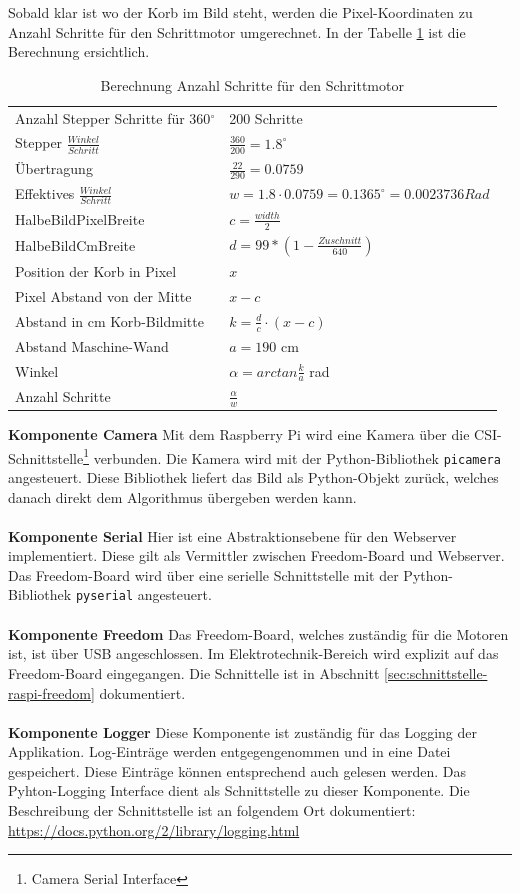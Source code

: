 \newpage
Sobald klar ist wo der Korb im Bild steht, werden die Pixel-Koordinaten zu Anzahl Schritte für den Schrittmotor umgerechnet. In der Tabelle \ref{tab:berechnung-steps} ist die Berechnung ersichtlich. 

\begin{table}[h!]
	\renewcommand{\arraystretch}{1.5}
	\centering
	\begin{tabular}{l l}
		Anzahl Stepper Schritte für 360$^\circ$ & 200 Schritte \\
		Stepper $\frac{Winkel}{Schritt}$ & $\frac{360}{200} = 1.8^\circ$ \\
		Übertragung & $\frac{22}{290} = 0.0759$ \\
		Effektives $\frac{Winkel}{Schritt}$ & $w = 1.8 \cdot 0.0759 = 0.1365^\circ = 0.0023736 Rad$ \\
		HalbeBildPixelBreite & $c = \frac{width}{2}$ \\
		HalbeBildCmBreite & $d = 99*(1-\frac{Zuschnitt}{640})$ \\
		Position der Korb in Pixel & $x$ \\
		Pixel Abstand von der Mitte & $x - c$ \\
		Abstand in cm Korb-Bildmitte & $k = \frac{d}{c} \cdot (x-c)$ \\
		Abstand Maschine-Wand & $a = 190$ cm \\
		Winkel & $\alpha = arctan\frac{k}{a}$ rad \\
		Anzahl Schritte & $\frac{\alpha}{w}$ \\
	\end{tabular}
	\label{tab:berechnung-steps}
	\caption{Berechnung Anzahl Schritte für den Schrittmotor}
\end{table}

\noindent
\textbf{Komponente Camera}
Mit dem Raspberry Pi wird eine Kamera über die CSI-Schnittstelle\footnote{Camera Serial Interface} verbunden. Die Kamera wird mit der Python-Bibliothek \texttt{picamera} angesteuert. Diese Bibliothek liefert das Bild als Python-Objekt zurück, welches danach direkt dem Algorithmus übergeben werden kann.
\\
\\
\textbf{Komponente Serial}
Hier ist eine Abstraktionsebene für den Webserver implementiert. Diese gilt als Vermittler zwischen Freedom-Board und Webserver. Das Freedom-Board wird über eine serielle Schnittstelle mit der Python-Bibliothek \texttt{pyserial} angesteuert.
\\
\\
\textbf{Komponente Freedom}
Das Freedom-Board, welches zuständig für die Motoren ist, ist über USB angeschlossen. Im Elektrotechnik-Bereich wird explizit auf das Freedom-Board eingegangen. Die Schnittelle ist in Abschnitt \ref{sec:schnittstelle-raspi-freedom} dokumentiert.
\\
\\
\textbf{Komponente Logger}
Diese Komponente ist zuständig für das Logging der Applikation. Log-Einträge werden entgegengenommen und in eine Datei gespeichert. Diese Einträge können entsprechend auch gelesen werden. Das Pyhton-Logging Interface dient als Schnittstelle zu dieser Komponente. Die Beschreibung der Schnittstelle ist an folgendem Ort dokumentiert: \href{https://docs.python.org/2/library/logging.html}{https://docs.python.org/2/library/logging.html}
